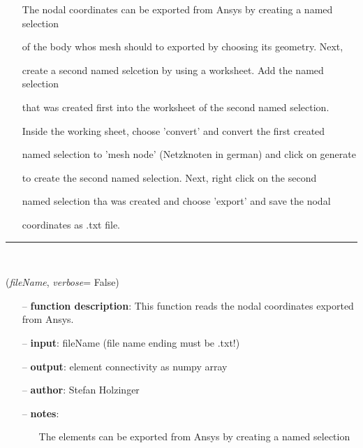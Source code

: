\begin{itemize}[leftmargin=1.4cm]
\begin{itemize}[leftmargin=1.4cm]
\begin{itemize}[leftmargin=1.4cm]
\begin{itemize}[leftmargin=0.5cm]
\begin{itemize}[leftmargin=1.4cm]
\begin{itemize}[leftmargin=1.4cm]
\begin{itemize}[leftmargin=0.5cm]
\begin{itemize}[leftmargin=0.7cm]
\begin{itemize}[leftmargin=1.2cm]
\setlength{\itemindent}{-0.7cm}
\item[]The nodal coordinates can be exported from Ansys by creating a named selection
\item[]of the body whos mesh should to exported by choosing its geometry. Next,
\item[]create a second named selcetion by using a worksheet. Add the named selection
\item[]that was created first into the worksheet of the second named selection.
\item[]Inside the working sheet, choose 'convert' and convert the first created
\item[]named selection to 'mesh node' (Netzknoten in german) and click on generate
\item[]to create the second named selection. Next, right click on the second
\item[]named selection tha was created and choose 'export' and save the nodal
\item[]coordinates as .txt file.
\end{itemize}
\vspace{12pt}\end{itemize}
%
\noindent\rule{8cm}{0.75pt}\vspace{1pt} \\ 
\begin{flushleft}
\label{sec:FEM:ReadElementsFromAnsysTxt}
({\it fileName}, {\it verbose}= False)
\end{flushleft}
\setlength{\itemindent}{0.7cm}
\begin{itemize}[leftmargin=0.7cm]
\item[--]
{\bf function description}: This function reads the nodal coordinates exported from Ansys.
\item[--]
{\bf input}: fileName (file name ending must be .txt!)
\item[--]
{\bf output}: element connectivity as numpy array
\item[--]
{\bf author}: Stefan Holzinger
\item[--]
{\bf notes}: \vspace{-6pt}
\begin{itemize}[leftmargin=1.2cm]
\setlength{\itemindent}{-0.7cm}
\item[]The elements can be exported from Ansys by creating a named selection

\end{itemize}
\end{itemize}
\end{itemize}
\end{itemize}
\end{itemize}
\end{itemize}
\end{itemize}
\end{itemize}
\end{itemize}
